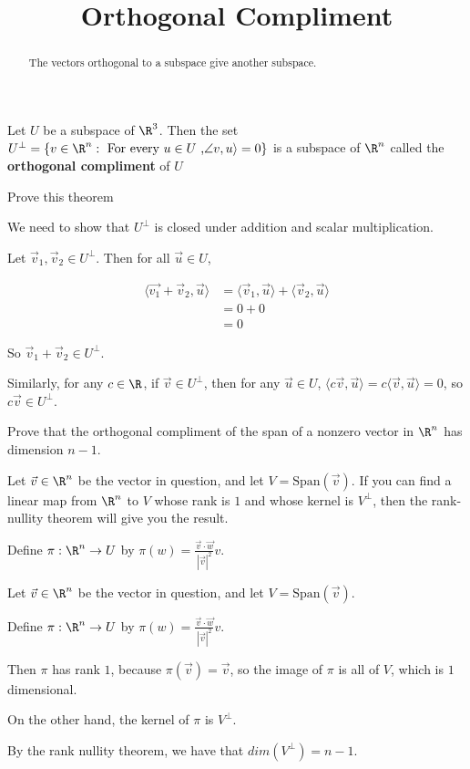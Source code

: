 \documentclass{ximera}
\title{Orthogonal Compliment}
\begin{document}
\begin{abstract}
	The vectors orthogonal to a subspace give another subspace.
\end{abstract}

\begin{theorem}
	Let $U$ be a subspace of $\R^3$.  Then the set $U^\perp = \{ v \in \R^n: \text{ For every \(u \in U\) ,} \angle v ,u\rangle = 0\}$ is a subspace of $\R^n$ 
	called the \textbf{orthogonal compliment} of $U$
\end{theorem}

Prove this theorem

\begin{free-response}
	We need to show that $U^\perp$ is closed under addition and scalar multiplication.
	
	Let $\vec{v}_1,\vec{v}_2 \in U^\perp$.  Then for all $\vec{u} \in U$,
	
	\begin{align*}
		\langle \vec{v_1}+\vec{v}_2, \vec{u} \rangle &= \langle \vec{v}_1, \vec{u}\rangle + \langle \vec{v}_2,\vec{u}\rangle\\
		&= 0+0\\
		&=0
	\end{align*}
	
	So $\vec{v}_1+\vec{v}_2 \in U^\perp$.
	
	Similarly, for any $c \in \R$, if $\vec{v} \in U^\perp$, then for any $\vec{u} \in U$, $\langle c\vec{v}, \vec{u} \rangle = c\langle \vec{v},\vec{u} \rangle = 0$, so 
	$c\vec{v} \in U^\perp$.
\end{free-response}

Prove that the orthogonal compliment of the span of a nonzero vector in $\R^n$ has dimension $n-1$.

\begin{hint}
	Let $\vec{v} \in \R^n$ be the vector in question, and let $V = \textrm{Span}(\vec{v})$.
	  If you can find a linear map from $\R^n$ to $V$ whose rank is $1$ and whose kernel is $V^\perp$, then the rank-nullity theorem will give you the result.
\end{hint}

\begin{hint}
	Define $\pi:\R^n \to U$ by $\pi(w) = \frac{\vec{v} \cdot \vec{w}}{|\vec{v}|^2} v$.
\end{hint}
\begin{free-response}
Let $\vec{v} \in \R^n$ be the vector in question, and let $V = \textrm{Span}(\vec{v})$.

Define $\pi:\R^n \to U$ by $\pi(w) = \frac{\vec{v} \cdot \vec{w}}{|\vec{v}|^2} v$.

Then $\pi$ has rank $1$, because $\pi(\vec{v}) = \vec{v}$, so the image of $\pi$ is all of $V$, which is $1$ dimensional.

On the other hand, the kernel of $\pi$ is $V^\perp$.

By the rank nullity theorem, we have that $dim(V^\perp) = n-1$.
\end{free-response}
\end{document}
